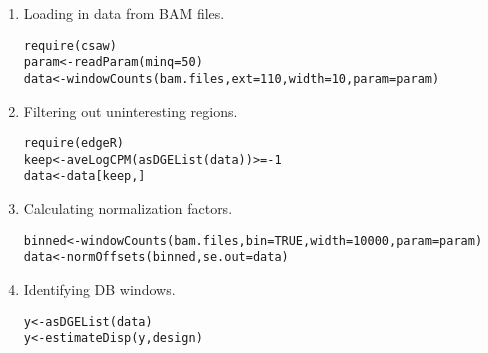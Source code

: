 \documentclass{report}\usepackage[]{graphicx}\usepackage[usenames,dvipsnames]{color}
\newcommand{\hlnum}[1]{\textcolor[rgb]{0.816,0.125,0.439}{#1}}%
\newcommand{\hlopt}[1]{\textcolor[rgb]{0,0,0}{#1}}%
\newcommand{\hlstd}[1]{\textcolor[rgb]{0.251,0.251,0.251}{#1}}%
\newcommand{\hlkwb}[1]{\textcolor[rgb]{0,0,0}{#1}}%
\newcommand{\hlkwc}[1]{\textcolor[rgb]{0.251,0.251,0.251}{#1}}%
\newcommand{\hlkwd}[1]{\textcolor[rgb]{0.878,0.439,0.125}{#1}}%
\newenvironment{knitrout}{}{} %
\begin{document}
\begin{enumerate}
\item Loading in data from BAM files.
\begin{knitrout}
\color{fgcolor}\begin{kframe}
\begin{alltt}
\hlkwd{require}\hlstd{(csaw)}
\hlstd{param} \hlkwb{<-} \hlkwd{readParam}\hlstd{(}\hlkwc{minq}\hlstd{=}\hlnum{50}\hlstd{)}
\hlstd{data} \hlkwb{<-} \hlkwd{windowCounts}\hlstd{(bam.files,} \hlkwc{ext}\hlstd{=}\hlnum{110}\hlstd{,} \hlkwc{width}\hlstd{=}\hlnum{10}\hlstd{,} \hlkwc{param}\hlstd{=param)}
\end{alltt}
\end{kframe}
\end{knitrout}
\item Filtering out uninteresting regions.
\begin{knitrout}
\color{fgcolor}\begin{kframe}
\begin{alltt}
\hlkwd{require}\hlstd{(edgeR)}
\hlstd{keep} \hlkwb{<-} \hlkwd{aveLogCPM}\hlstd{(}\hlkwd{asDGEList}\hlstd{(data))} \hlopt{>= -}\hlnum{1}
\hlstd{data} \hlkwb{<-} \hlstd{data[keep,]}
\end{alltt}
\end{kframe}
\end{knitrout}
\item Calculating normalization factors.
\begin{knitrout}
\color{fgcolor}\begin{kframe}
\begin{alltt}
\hlstd{binned} \hlkwb{<-} \hlkwd{windowCounts}\hlstd{(bam.files,} \hlkwc{bin}\hlstd{=}\hlnum{TRUE}\hlstd{,} \hlkwc{width}\hlstd{=}\hlnum{10000}\hlstd{,} \hlkwc{param}\hlstd{=param)}
\hlstd{data} \hlkwb{<-} \hlkwd{normOffsets}\hlstd{(binned,} \hlkwc{se.out}\hlstd{=data)}
\end{alltt}
\end{kframe}
\end{knitrout}
\item Identifying DB windows.
\begin{knitrout}
\color{fgcolor}\begin{kframe}
\begin{alltt}
\hlstd{y} \hlkwb{<-} \hlkwd{asDGEList}\hlstd{(data)}
\hlstd{y} \hlkwb{<-} \hlkwd{estimateDisp}\hlstd{(y, design)}

\end{alltt}
\end{kframe}
\end{knitrout}
\end{enumerate}
\end{document}
